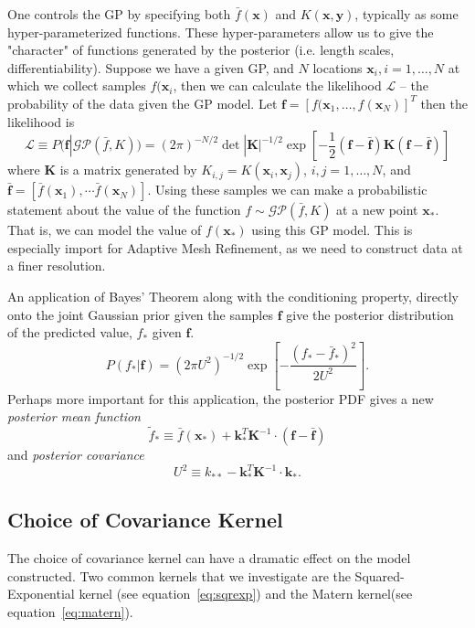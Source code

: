 \documentclass{article}%
\begin{document}
One controls the GP by specifying both $\bar{f}(\mathbf{x})$ and $K(\mathbf{x}, \mathbf{y})$,
typically as some hyper-parameterized functions. These hyper-parameters allow us to give the
"character" of functions generated by the posterior (i.e. length scales, differentiability).
Suppose we have a given GP, and $N$ locations $\mathbf{x}_i, i = 1, \dots, N$ at which we collect
samples $f(\mathbf{x}_i$, then we can calculate the likelihood $\mathcal{L}$ -- the probability of
the data given the GP model. Let
$\mathbf{f} = \left[f(\mathbf{x}_1, \dots, f(\mathbf{x}_N) \right]^T $ then the likelihood is
\begin{equation} 
\mathcal{L} \equiv P(\mathbf{f} | \mathcal{GP}(\bar{f}, K)) = (2\pi)^{-N/2} \det |\mathbf{K}|^{-1/2} 
\exp\left[-\frac{1}{2}\left(\mathbf{f} - \bar{\mathbf{f}}\right)\mathbf{K}
\left(\mathbf{f} - \bar{\mathbf{f}}\right)\right]
\label{eq:likely}
\end{equation}
where $\mathbf{K}$  is a matrix generated by
$K_{i,j} = K(\mathbf{x}_i, \mathbf{x}_j)$, $i, j = 1,\dots, N$,
and $\bar{\mathbf{f}} = [\bar{f}(\mathbf{x}_1), \cdots \bar{f}(\mathbf{x}_N)]$. Using these samples we can make a
probabilistic statement about the value of the function $f \sim \mathcal{GP}(\bar{f}, K)$
at a new point $\mathbf{x}_*$. That is, we can model the value of $f(\mathbf{x}_*)$ using this GP model. This
is especially import for Adaptive Mesh Refinement, as we need to construct data at a finer resolution.

An application of Bayes' Theorem along with the conditioning property, directly onto the joint Gaussian prior
given the samples $\mathbf{f}$ give the posterior distribution of the predicted value, $f_*$ given $\mathbf{f}$.
\begin{equation} 
P(f_* | \mathbf{f}) = (2\pi U^2)^{-1/2} \exp\left[- \frac{(f_* - \bar{f}_*)^2}{2U^2}\right].
\end{equation}
Perhaps more important for this application, the posterior PDF gives a new \textit{posterior mean function}
\begin{equation}
\tilde{f}_* \equiv \bar{f}(\mathbf{x}_*) + \mathbf{k}_*^T\mathbf{K}^{-1}\cdot(\mathbf{f} - \bar{\mathbf{f}})
\label{eq:mean}
\end{equation}
and \textit{posterior covariance}
\begin{equation} 
U^2 \equiv k_{**} - \mathbf{k}_*^T\mathbf{K}^{-1}\cdot\mathbf{k}_*.
\end{equation}

\subsection{Choice of Covariance Kernel} 
The choice of covariance kernel can have a dramatic effect on the model 
constructed. Two common kernels that we investigate are the Squared-Exponential 
kernel (see equation~\ref{eq:sqrexp}) and the Matern kernel(see equation~\ref{eq:matern}).  
\end{document}
